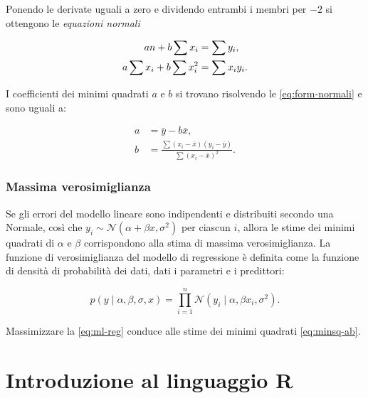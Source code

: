 \documentclass[
  11pt,
]{krantz}
\theoremstyle{definition}
\theoremstyle{definition}
\theoremstyle{definition}
\theoremstyle{definition}
\theoremstyle{remark}
\begin{document}
Ponendo le derivate uguali a zero e dividendo entrambi i membri per \(-2\) si ottengono le \emph{equazioni normali}

\begin{align}
 an + b \sum x_i &= \sum y_i, \notag \\
 a \sum x_i + b \sum x_i^2 &= \sum x_i y_i. 
 \label{eq:form-normali}
\end{align}

I coefficienti dei minimi quadrati \(a\) e \(b\) si trovano risolvendo le \eqref{eq:form-normali} e sono uguali a:

\begin{align}
a &= \bar{y} - b \bar{x},\\
b &= \frac{\sum (x_i - \bar{x}) (y_i - \bar{y})}{\sum (x_i - \bar{x})^2}.
\label{eq:minsq-ab}
\end{align}

\hypertarget{massima-verosimiglianza}{%
\subsection{Massima verosimiglianza}\label{massima-verosimiglianza}}

Se gli errori del modello lineare sono indipendenti e distribuiti secondo una Normale, così che \(y_i \sim \mathcal{N}(\alpha + \beta x, \sigma^2)\) per ciascun \(i\), allora le stime dei minimi quadrati di \(\alpha\) e \(\beta\) corrispondono alla stima di massima verosimiglianza. La funzione di verosimiglianza del modello di regressione è definita come la funzione di densità di probabilità dei dati, dati i parametri e i predittori:

\begin{equation}
p(y \mid \alpha, \beta, \sigma, x) = \prod_{i=1}^n \mathcal{N}(y_i \mid \alpha, \beta x_i, \sigma^2). 
\label{eq:ml-reg}
\end{equation}

Massimizzare la \eqref{eq:ml-reg} conduce alle stime dei minimi quadrati \eqref{eq:minsq-ab}.

\hypertarget{introduzione-al-linguaggio-r}{%
\chapter{Introduzione al linguaggio R}\label{introduzione-al-linguaggio-r}}
\end{document}
